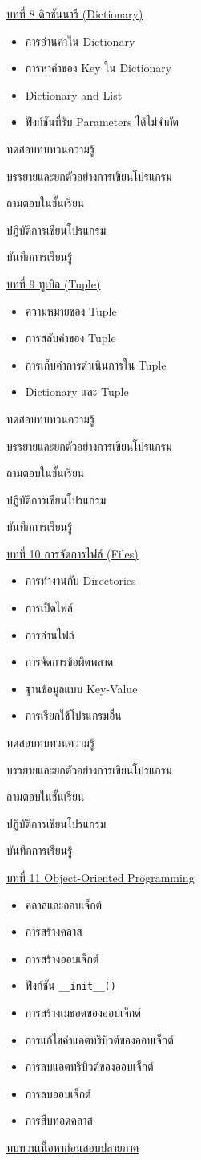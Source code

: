 {
\underline{บทที่ 8 ดิกชันนารี (Dictionary)}
\begin{itemize}
\item การอ่านค่าใน Dictionary
\item การหาค่าของ Key ใน Dictionary
\item Dictionary and List
\item ฟังก์ชันที่รับ Parameters ได้ไม่จำกัด
\end{itemize}
}
{
\item ทดสอบทบทวนความรู้
\item  บรรยายและยกตัวอย่างการเขียนโปรแกรม
\item  ถามตอบในชั้นเรียน
\item  ปฏิบัติการเขียนโปรแกรม
\item  บันทึกการเรียนรู้
}
{
\underline{บทที่ 9 ทูเบิล (Tuple)}
\begin{itemize}
\item ความหมายของ Tuple
\item การสลับค่าของ Tuple
\item การเก็บค่าการดำเนินการใน Tuple
\item Dictionary และ Tuple
\end{itemize}
}
{
\item ทดสอบทบทวนความรู้
\item  บรรยายและยกตัวอย่างการเขียนโปรแกรม
\item  ถามตอบในชั้นเรียน
\item  ปฏิบัติการเขียนโปรแกรม
\item  บันทึกการเรียนรู้
}
{
\underline{บทที่ 10 การจัดการไฟล์ (Files)}
\begin{itemize}
\item การทำงานกับ Directories
\item การเปิดไฟล์
\item การอ่านไฟล์
\item การจัดการข้อผิดพลาด
\item ฐานข้อมูลแบบ Key-Value
\item การเรียกใช้โปรแกรมอื่น
\end{itemize}
}
{
\item ทดสอบทบทวนความรู้
\item  บรรยายและยกตัวอย่างการเขียนโปรแกรม
\item  ถามตอบในชั้นเรียน
\item  ปฏิบัติการเขียนโปรแกรม
\item  บันทึกการเรียนรู้
}
{
\underline{บทที่ 11 Object-Oriented Programming}
\begin{itemize}
\item คลาสและออบเจ็กต์
\item การสร้างคลาส
\item การสร้างออบเจ็กต์
\item ฟังก์ชัน \texttt{\_\_init\_\_()}
\item การสร้างเมธอดของออบเจ็กต์
\item การแก้ไขค่าแอตทริบิวต์ของออบเจ็กต์
\item การลบแอตทริบิวต์ของออบเจ็กต์
\item การลบออบเจ็กต์
\item การสืบทอดคลาส
\end{itemize}

\underline{ทบทวนเนื้อหาก่อนสอบปลายภาค}
}
